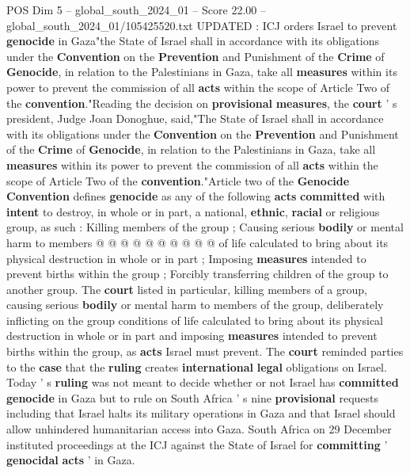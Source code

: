 \begin{textsample}{POS Dim 5 – global\_south\_2024\_01 – Score 22.00 – global\_south\_2024\_01/105425520.txt}  \label{ex:f5_pos_004}
UPDATED : ICJ orders Israel to prevent \textbf{genocide} in Gaza"the State of Israel shall in accordance with its obligations under the \textbf{Convention} on the \textbf{Prevention} and Punishment of the \textbf{Crime} of \textbf{Genocide}, in relation to the Palestinians in Gaza, take all \textbf{measures} within its power to prevent the commission of all \textbf{acts} within the scope of Article Two of the \textbf{convention}."Reading the decision on \textbf{provisional} \textbf{measures}, the \textbf{court} ' s president, Judge Joan Donoghue, said,"The State of Israel shall in accordance with its obligations under the \textbf{Convention} on the \textbf{Prevention} and Punishment of the \textbf{Crime} of \textbf{Genocide}, in relation to the Palestinians in Gaza, take all \textbf{measures} within its power to prevent the commission of all \textbf{acts} within the scope of Article Two of the \textbf{convention}."Article two of the \textbf{Genocide} \textbf{Convention} defines \textbf{genocide} as any of the following \textbf{acts} \textbf{committed} with \textbf{intent} to destroy, in whole or in part, a national, \textbf{ethnic}, \textbf{racial} or religious group, as such : Killing members of the group ; Causing serious \textbf{bodily} or mental harm to members @ @ @ @ @ @ @ @ @ @ of life calculated to bring about its physical destruction in whole or in part ; Imposing \textbf{measures} intended to prevent births within the group ; Forcibly transferring children of the group to another group.
The \textbf{court} listed in particular, killing members of a group, causing serious \textbf{bodily} or mental harm to members of the group, deliberately inflicting on the group conditions of life calculated to bring about its physical destruction in whole or in part and imposing \textbf{measures} intended to prevent births within the group, as \textbf{acts} Israel must prevent.
The \textbf{court} reminded parties to the \textbf{case} that the \textbf{ruling} creates \textbf{international} \textbf{legal} obligations on Israel.
Today ' s \textbf{ruling} was not meant to decide whether or not Israel has \textbf{committed} \textbf{genocide} in Gaza but to rule on South Africa ' s nine \textbf{provisional} requests including that Israel halts its military operations in Gaza and that Israel should allow unhindered humanitarian access into Gaza.
South Africa on 29 December instituted proceedings at the ICJ against the State of Israel for \textbf{committing} ' \textbf{genocidal} \textbf{acts} ' in Gaza.

\end{textsample}
